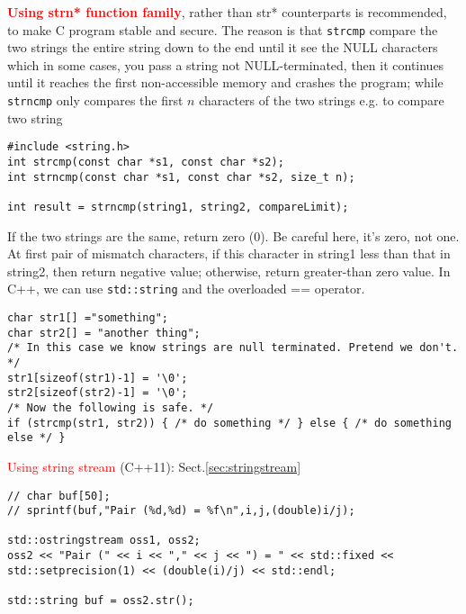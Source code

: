  

\textcolor{red}{\bf Using strn* function family}, rather than str* counterparts
is recommended, to make C program stable and secure. The reason is that
\verb!strcmp! compare the two strings the entire string down to the end until
it see the NULL characters which in some cases, you pass a string not
NULL-terminated, then it continues until it reaches the first non-accessible
memory and crashes the program; while \verb!strncmp! only compares the first
$n$ characters of the two strings e.g. to compare two string
\begin{verbatim}
#include <string.h>
int strcmp(const char *s1, const char *s2);
int strncmp(const char *s1, const char *s2, size_t n);

int result = strncmp(string1, string2, compareLimit);
\end{verbatim}
If the two strings are the same, return zero (0). Be careful here, it's zero,
not one. At first pair of mismatch characters, if this character in string1 less
than that in string2, then return negative value; otherwise, return
greater-than zero value. In C++, we can use \verb!std::string! and the
overloaded == operator.

\begin{verbatim}
char str1[] ="something";
char str2[] = "another thing";
/* In this case we know strings are null terminated. Pretend we don't. */
str1[sizeof(str1)-1] = '\0';
str2[sizeof(str2)-1] = '\0';
/* Now the following is safe. */
if (strcmp(str1, str2)) { /* do something */ } else { /* do something else */ }
\end{verbatim}

\textcolor{red}{Using string stream} (C++11): Sect.\ref{sec:stringstream}
\begin{lstlisting}
// char buf[50];
// sprintf(buf,"Pair (%d,%d) = %f\n",i,j,(double)i/j);

std::ostringstream oss1, oss2;
oss2 << "Pair (" << i << "," << j << ") = " << std::fixed << std::setprecision(1) << (double(i)/j) << std::endl;

std::string buf = oss2.str();
\end{lstlisting}

